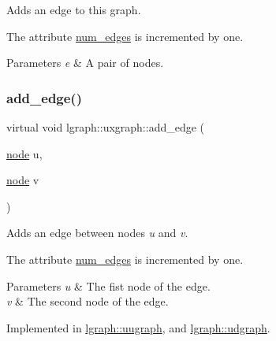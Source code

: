 Adds an edge to this graph. 

The attribute \hyperlink{classlgraph_1_1xxgraph_a6765a9a3be42f6e0f824635c593b35d7}{num\+\_\+edges} is incremented by one.


\begin{DoxyParams}{Parameters}
{\em e} & A pair of nodes. \\
\hline
\end{DoxyParams}
\mbox{\label{classlgraph_1_1uxgraph_a5cf2ae9cf398b712fb9fe080b6976587}} 
\subsubsection{\texorpdfstring{add\+\_\+edge()}{add\_edge()}\hspace{0.1cm}{\footnotesize\ttfamily [2/2]}}
{\footnotesize\ttfamily virtual void lgraph\+::uxgraph\+::add\+\_\+edge (\begin{DoxyParamCaption}\item[{\hyperlink{namespacelgraph_a397169dd66adf725210a30fb7251773e}{node}}]{u,  }\item[{\hyperlink{namespacelgraph_a397169dd66adf725210a30fb7251773e}{node}}]{v }\end{DoxyParamCaption})\hspace{0.3cm}{\ttfamily [pure virtual]}}



Adds an edge between nodes {\itshape u} and {\itshape v}. 

The attribute \hyperlink{classlgraph_1_1xxgraph_a6765a9a3be42f6e0f824635c593b35d7}{num\+\_\+edges} is incremented by one.


\begin{DoxyParams}{Parameters}
{\em u} & The fist node of the edge. \\
\hline
{\em v} & The second node of the edge. \\
\hline
\end{DoxyParams}


Implemented in \hyperlink{classlgraph_1_1uugraph_aab99d94a39626616f99b81e5cdbe1ebd}{lgraph\+::uugraph}, and \hyperlink{classlgraph_1_1udgraph_a4b847dd4d6d2e814f30bcddccc16cfc6}{lgraph\+::udgraph}.

\mbox{\label{classlgraph_1_1uxgraph_ad20f841d6bb1147d087546c6054c55f3}} 
